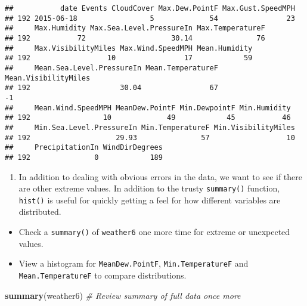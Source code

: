 \documentclass[]{article}
\newenvironment{Shaded}{\begin{snugshade}}{\end{snugshade}}
\newcommand{\KeywordTok}[1]{\textcolor[rgb]{0.13,0.29,0.53}{\textbf{#1}}}
\newcommand{\DecValTok}[1]{\textcolor[rgb]{0.00,0.00,0.81}{#1}}
\newcommand{\StringTok}[1]{\textcolor[rgb]{0.31,0.60,0.02}{#1}}
\newcommand{\CommentTok}[1]{\textcolor[rgb]{0.56,0.35,0.01}{\textit{#1}}}
\newcommand{\OperatorTok}[1]{\textcolor[rgb]{0.81,0.36,0.00}{\textbf{#1}}}
\newcommand{\NormalTok}[1]{#1}
\providecommand{\tightlist}{%
  \setlength{\itemsep}{0pt}\setlength{\parskip}{0pt}}
\begin{document}
\begin{verbatim}
##           date Events CloudCover Max.Dew.PointF Max.Gust.SpeedMPH
## 192 2015-06-18                 5             54                23
##     Max.Humidity Max.Sea.Level.PressureIn Max.TemperatureF
## 192           72                    30.14               76
##     Max.VisibilityMiles Max.Wind.SpeedMPH Mean.Humidity
## 192                  10                17            59
##     Mean.Sea.Level.PressureIn Mean.TemperatureF Mean.VisibilityMiles
## 192                     30.04                67                   -1
##     Mean.Wind.SpeedMPH MeanDew.PointF Min.DewpointF Min.Humidity
## 192                 10             49            45           46
##     Min.Sea.Level.PressureIn Min.TemperatureF Min.VisibilityMiles
## 192                    29.93               57                  10
##     PrecipitationIn WindDirDegrees
## 192               0            189
\end{verbatim}

\begin{Shaded}
\end{Shaded}

\begin{enumerate}
\def\labelenumi{\arabic{enumi}.}
\setcounter{enumi}{10}
\tightlist
\item
  In addition to dealing with obvious errors in the data, we want to see
  if there are other extreme values. In addition to the trusty
  \texttt{summary()} function, \texttt{hist()} is useful for quickly
  getting a feel for how different variables are distributed.
\end{enumerate}

\begin{itemize}
\item
  Check a \texttt{summary()} of \texttt{weather6} one more time for
  extreme or unexpected values.
\item
  View a histogram for \texttt{MeanDew.PointF},
  \texttt{Min.TemperatureF} and \texttt{Mean.TemperatureF} to compare
  distributions.
\end{itemize}

\begin{Shaded}
\begin{Highlighting}[]
\KeywordTok{summary}\NormalTok{(weather6) }\CommentTok{# Review summary of full data once more}
\end{Highlighting}
\end{Shaded}
\end{document}
